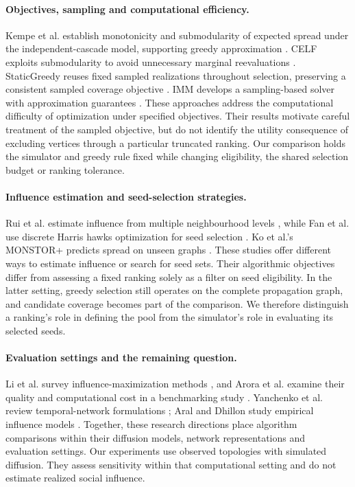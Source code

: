 \documentclass[smallextended]{svjour3}
\begin{document}
\paragraph{Objectives, sampling and computational efficiency.} Kempe et al. establish monotonicity and submodularity of expected spread under the independent-cascade model, supporting greedy approximation \cite{ref1}. CELF exploits submodularity to avoid unnecessary marginal reevaluations \cite{ref7}. StaticGreedy reuses fixed sampled realizations throughout selection, preserving a consistent sampled coverage objective \cite{ref8}. IMM develops a sampling-based solver with approximation guarantees \cite{ref2}. These approaches address the computational difficulty of optimization under specified objectives. Their results motivate careful treatment of the sampled objective, but do not identify the utility consequence of excluding vertices through a particular truncated ranking. Our comparison holds the simulator and greedy rule fixed while changing eligibility, the shared selection budget or ranking tolerance.

\paragraph{Influence estimation and seed-selection strategies.} Rui et al. estimate influence from multiple neighbourhood levels \cite{ref12}, while Fan et al. use discrete Harris hawks optimization for seed selection \cite{ref13}. Ko et al.'s MONSTOR+ predicts spread on unseen graphs \cite{ref19}. These studies offer different ways to estimate influence or search for seed sets. Their algorithmic objectives differ from assessing a fixed ranking solely as a filter on seed eligibility. In the latter setting, greedy selection still operates on the complete propagation graph, and candidate coverage becomes part of the comparison. We therefore distinguish a ranking's role in defining the pool from the simulator's role in evaluating its selected seeds.

\paragraph{Evaluation settings and the remaining question.} Li et al. survey influence-maximization methods \cite{ref9}, and Arora et al. examine their quality and computational cost in a benchmarking study \cite{ref16}. Yanchenko et al. review temporal-network formulations \cite{ref11}; Aral and Dhillon study empirical influence models \cite{ref15}. Together, these research directions place algorithm comparisons within their diffusion models, network representations and evaluation settings. Our experiments use observed topologies with simulated diffusion. They assess sensitivity within that computational setting and do not estimate realized social influence.
\end{document}
